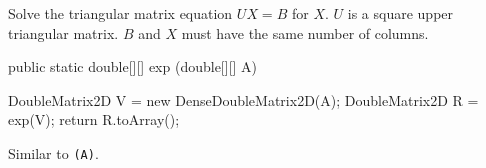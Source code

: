 \begin{tabb} Solve the triangular matrix equation $UX = B$ for $X$.
 $U$ is a square upper triangular matrix. $B$ and $X$ must have the same
number of columns.
\end{tabb}
\begin{htmlonly}
\end{htmlonly}
\begin{code}

   public static double[][] exp (double[][] A) \begin{hide} {
      DoubleMatrix2D V = new DenseDoubleMatrix2D(A);
      DoubleMatrix2D R = exp(V);
      return R.toArray();
   } \end{hide}
\end{code}
\begin{tabb} Similar to \texttt{(A)}.
\end{tabb}
\begin{htmlonly}
\end{htmlonly}
